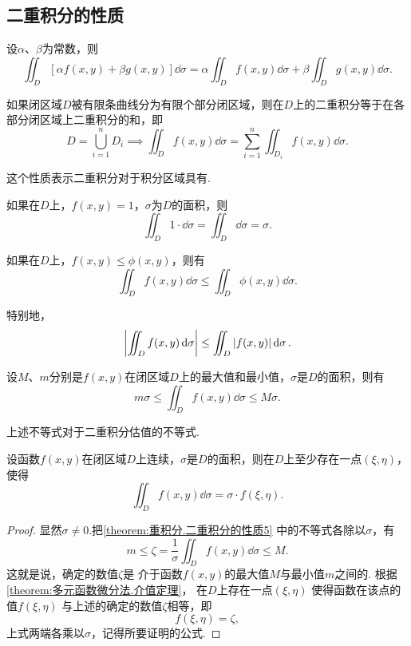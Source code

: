 \subsection{二重积分的性质}
\begin{property}\label{theorem:重积分.二重积分的性质1}
设\(\alpha\)、\(\beta\)为常数，则\[
\iint_D [\alpha f(x,y)+\beta g(x,y)] \dd{\sigma}
=\alpha \iint_D f(x,y) \dd{\sigma}
+\beta \iint_D g(x,y) \dd{\sigma}.
\]
\end{property}

\begin{property}\label{theorem:重积分.二重积分的性质2}
如果闭区域\(D\)被有限条曲线分为有限个部分闭区域，则在\(D\)上的二重积分等于在各部分闭区域上二重积分的和，即\[
D = \bigcup_{i=1}^n D_i
\implies
\iint_D f(x,y) \dd{\sigma}
= \sum_{i=1}^n \iint_{D_i} f(x,y) \dd{\sigma}.
\]
\end{property}
这个性质表示二重积分对于积分区域具有.

\begin{property}\label{theorem:重积分.二重积分的性质3}
如果在\(D\)上，\(f(x,y)=1\)，\(\sigma\)为\(D\)的面积，则\[
\iint_D 1\cdot\dd{\sigma}
=\iint_D \dd{\sigma}
=\sigma.
\]
\end{property}

\begin{property}\label{theorem:重积分.二重积分的性质4}
如果在\(D\)上，\(f(x,y) \leq \phi(x,y)\)，则有\[
\iint_D f(x,y) \dd{\sigma} \leq \iint_D \phi(x,y) \dd{\sigma}.
\]

特别地，\[
\abs{\iint_D f(x,y) \dd{\sigma}} \leq \iint_D \abs{f(x,y)} \dd{\sigma}.
\]
\end{property}

\begin{property}\label{theorem:重积分.二重积分的性质5}
设\(M\)、\(m\)分别是\(f(x,y)\)在闭区域\(D\)上的最大值和最小值，\(\sigma\)是\(D\)的面积，则有\[
m\sigma \leq \iint_D f(x,y) \dd{\sigma} \leq M\sigma.
\]
\end{property}
上述不等式对于二重积分估值的不等式.

\begin{property}[二重积分的中值定理]\label{theorem:重积分.二重积分的中值定理}
设函数\(f(x,y)\)在闭区域\(D\)上连续，\(\sigma\)是\(D\)的面积，则在\(D\)上至少存在一点\((\xi,\eta)\)，使得\[
\iint_D f(x,y) \dd{\sigma} = \sigma \cdot f(\xi,\eta).
\]
\begin{proof}
显然\(\sigma\neq0\).把\cref{theorem:重积分.二重积分的性质5} 中的不等式各除以\(\sigma\)，有\[
m
\leq
\zeta = \frac{1}{\sigma} \iint_D f(x,y) \dd{\sigma}
\leq
M.
\]
这就是说，确定的数值\(\zeta\)是%
介于函数\(f(x,y)\)的最大值\(M\)与最小值\(m\)之间的.
根据\cref{theorem:多元函数微分法.介值定理}，
在\(D\)上存在一点\((\xi,\eta)\)%
使得函数在该点的值\(f(\xi,\eta)\)%
与上述的确定的数值\(\zeta\)相等，即\[
f(\xi,\eta) = \zeta,
\]上式两端各乘以\(\sigma\)，记得所要证明的公式.
\end{proof}
\end{property}

